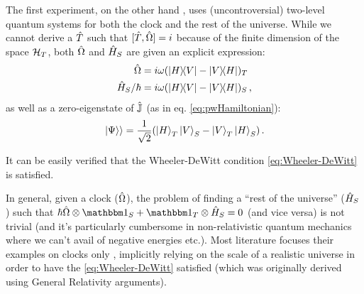 The first experiment, on the other hand \parencite{Moreva:illustration,Moreva:synthetic},
uses (uncontroversial)
two-level quantum systems for both the clock and the rest of the universe.
While we cannot derive a $\hat{T}$ such that $[\hat{T}, \hat{\Omega}] = i$
because of the finite dimension of the space $\mathcal{H}_T$, both $\hat{\Omega}$
and $\hat{H}_S$ are given an explicit expression:
\begin{align}\label{eq:MorevaOmegaT}
  \hat{\Omega}            &= i\omega(\ketbra{H}{V}- \ketbra{V}{H})_T \\
  \hat{H}_S/{\hbar}       &= i\omega(\ketbra{H}{V}- \ketbra{V}{H})_S
  \,\text{,}
\end{align}
as well as a zero-eigenstate of $\hat{\mathbb{J}}$ (as in eq. \ref{eq:pwHamiltonian}):
\begin{equation}\label{eq:moreva:overall_state}
  \left.\left| \Psi \right\rangle\right\rangle = \frac{1}{\sqrt{2}}\qty(\ket{H}_T\ket{V}_S-\ket{V}_T\ket{H}_S)
  \,\text{.}
\end{equation}

It can be easily verified that the Wheeler-DeWitt condition
\eqref{eq:Wheeler-DeWitt} is satisfied.

In general, given a clock ($\hat{\Omega}$), the problem of finding a
``rest of the universe'' ($\hat{H}_S$) such that
$\hbar\op{\Omega}\ox\idop_S + \idop_T\ox\op{H}_S = 0$
(and vice versa)
is not trivial
(and it's particularly cumbersome in non-relativistic
quantum mechanics where we can't avail of negative energies etc.).
Most literature focuses their examples on clocks only
\parencite{Prvanovic,RealisticClocks,HarmonicClocks},
implicitly relying on the scale of a realistic universe
in order to have the \eqref{eq:Wheeler-DeWitt} satisfied
(which was originally derived using General Relativity arguments).
